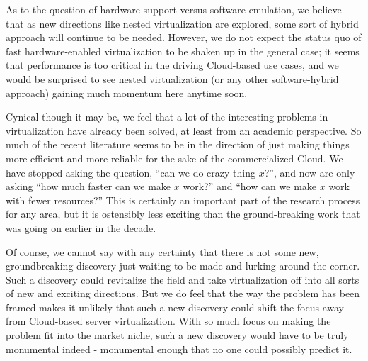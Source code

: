 \documentclass[letterpaper, twocolumn]{article}
\begin{document}
As to the question of hardware support versus software emulation, we believe that as
new directions like nested virtualization are explored, some sort of hybrid approach
will continue to be needed.  However, we do not expect the status quo of fast hardware-enabled
virtualization to be shaken up in the general case; it seems that performance is too critical
in the driving Cloud-based use cases, and we would be surprised to see nested virtualization
(or any other software-hybrid approach) gaining much momentum here anytime soon.

Cynical though it may be, we feel that a lot of the interesting problems in virtualization
have already been solved, at least from an academic perspective.  So much of the recent
literature seems to be in the direction of just making things more efficient and more
reliable for the sake of the commercialized Cloud.  We have stopped asking the question,
``can we do crazy thing $x$?'', and now are only asking ``how much faster can we make $x$ work?''
and ``how can we make $x$ work with fewer resources?''  This is certainly an important part of
the research process for any area, but it is ostensibly
less exciting than the ground-breaking work that was going on earlier in the decade.

Of course, we cannot say with any certainty that there is not some new, groundbreaking discovery
just waiting to be made and lurking around the corner.  Such a discovery could revitalize the field
and take virtualization off into all sorts of new and exciting directions.  But we do feel that
the way the problem has been framed makes it unlikely that such a new discovery could shift
the focus away from Cloud-based server virtualization.  With so much focus on making the problem
fit into the market niche, such a new discovery would have to be truly monumental indeed -
monumental enough that no one could possibly predict it.
\end{document}
